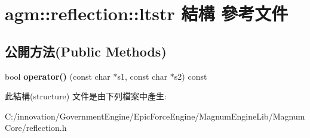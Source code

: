 \hypertarget{structagm_1_1reflection_1_1ltstr}{}\section{agm\+:\+:reflection\+:\+:ltstr 結構 參考文件}
\label{structagm_1_1reflection_1_1ltstr}
\subsection*{公開方法(Public Methods)}
\begin{DoxyCompactItemize}
\item 
bool {\bfseries operator()} (const char $\ast$s1, const char $\ast$s2) const \hypertarget{structagm_1_1reflection_1_1ltstr_a3601696ad0ded09200b4b1adaea8176b}{}\label{structagm_1_1reflection_1_1ltstr_a3601696ad0ded09200b4b1adaea8176b}

\end{DoxyCompactItemize}


此結構(structure) 文件是由下列檔案中產生\+:\begin{DoxyCompactItemize}
\item 
C\+:/innovation/\+Government\+Engine/\+Epic\+Force\+Engine/\+Magnum\+Engine\+Lib/\+Magnum\+Core/reflection.\+h\end{DoxyCompactItemize}
